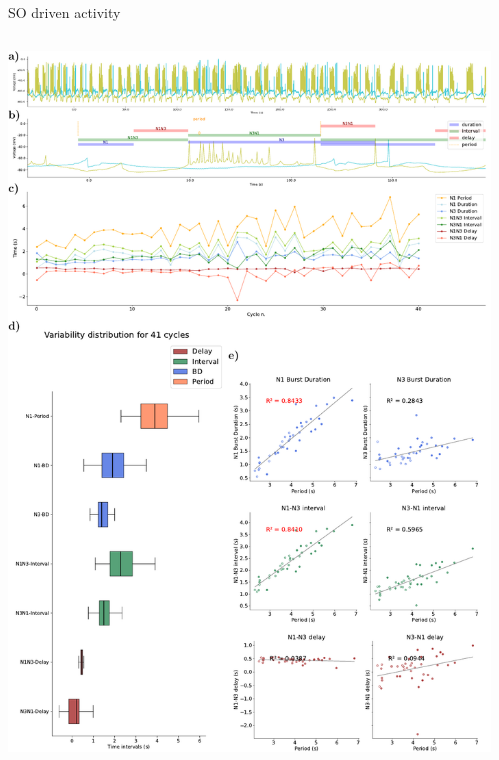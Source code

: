 \documentclass[aspectratio=43]{beamer}
\begin{document}
\begin{frame}{SO driven activity}
	\begin{columns}
		\begin{column}{0.5\textwidth}
			\includegraphics[width=\textwidth]{invariants/data/SUSSEX/SO_driven/images/panel_with_intervals.pdf}
		\end{column}
		\begin{column}{0.5\textwidth}

\end{column}
\end{columns}
\end{frame}
\end{document}
